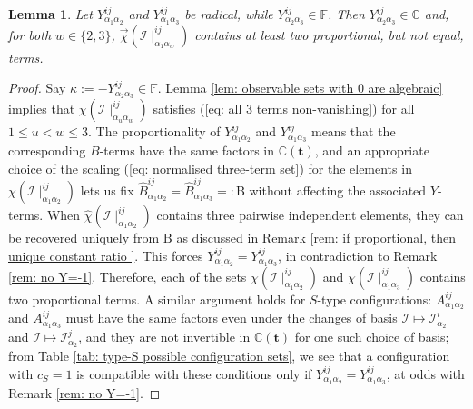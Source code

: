 \documentclass[10pt]{article}
\newtheorem{lem}{Lemma}%
\theoremstyle{remark}%
\theoremstyle{definition}%
\begin{document}
\begin{lem}
\label{lem: constant Y-terms in radical triples} 
Let $Y_{\alpha_{1}\alpha_{2}}^{ij}$ and $Y_{\alpha_{1}\alpha_{3}}^{ij}$ be radical, while $Y_{\alpha_{2}\alpha_{3}}^{ij}\in\mathbb{F}$. Then $Y_{\alpha_{2}\alpha_{3}}^{ij}\in\mathbb{C}$ and, for both $w\in\{2,3\}$, $\overrightarrow{\chi}(\mathcal{I}\mid_{\alpha_{1}\alpha_{w}}^{ij})$ contains at least two proportional, but not equal, terms.
\end{lem}
\begin{proof}
Say $\kappa:=-Y_{\alpha_{2}\alpha_{3}}^{ij}\in\mathbb{F}$. Lemma \ref{lem: observable sets with 0 are algebraic} implies that $\chi(\mathcal{I}\mid_{\alpha_{u}\alpha_{w}}^{ij})$ satisfies (\ref{eq: all 3 terms non-vanishing}) for all $1\leq u < w \leq 3$.
The proportionality of $Y_{\alpha_{1}\alpha_{2}}^{ij}$ and $Y_{\alpha_{1}\alpha_{3}}^{ij}$ 
means that the corresponding $B$-terms have the same factors in $\mathbb{C}(\mathbf{t})$, and an appropriate choice of the scaling (\ref{eq: normalised three-term set}) for the elements in $\chi(\mathcal{I}\mid_{\alpha_{1}\alpha_{2}}^{ij})$ lets us fix $\hat{B}_{\alpha_{1}\alpha_{2}}^{ij}=\hat{B}_{\alpha_{1}\alpha_{3}}^{ij}=:\mathrm{B}$ without affecting the associated $Y$-terms. When $\hat{\chi}(\mathcal{I}\mid_{\alpha_{1}\alpha_{2}}^{ij})$ contains three pairwise independent elements, they can be recovered uniquely from $\mathrm{B}$ as discussed in Remark \ref{rem: if proportional, then unique constant ratio }. This forces $Y_{\alpha_{1}\alpha_{2}}^{ij}=Y_{\alpha_{1}\alpha_{3}}^{ij}$, in contradiction to Remark \ref{rem: no Y=-1}. Therefore, each of the sets $\chi(\mathcal{I}\mid_{\alpha_{1}\alpha_{2}}^{ij})$ and $\chi(\mathcal{I}\mid_{\alpha_{1}\alpha_{3}}^{ij})$ contains two proportional terms.
A similar argument holds for $S$-type configurations: $A_{\alpha_{1}\alpha_{2}}^{ij}$ and $A_{\alpha_{1}\alpha_{3}}^{ij}$ must have the same factors even under the changes of basis $\mathcal{I}\mapsto\mathcal{I}_{\alpha_{2}}^{i}$ and $\mathcal{I}\mapsto\mathcal{I}_{\alpha_{2}}^{j}$, and they are not invertible in $\mathbb{C}(\mathbf{t})$ for one such choice of basis; from Table \ref{tab: type-S possible configuration sets}, we see that a configuration with $c_{S}=1$ is compatible with these conditions only if $Y_{\alpha_{1}\alpha_{2}}^{ij}=Y_{\alpha_{1}\alpha_{3}}^{ij}$, at odds with Remark \ref{rem: no Y=-1}. 
\end{proof}
\end{document}
